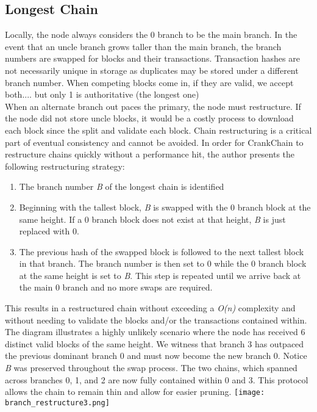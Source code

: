 \documentclass[10pt,twocolumn]{article}
\begin{document}
\subsection{Longest Chain}
Locally, the node always considers the 0 branch to be the main branch.  In the event that an uncle branch grows taller than the main branch, the branch numbers are swapped for blocks and their transactions.  Transaction hashes are not necessarily unique in storage as duplicates may be stored under a different branch number. When competing blocks come in, if they are valid, we accept both.... but only 1 is authoritative (the longest one)\\
When an alternate branch out paces the primary, the node must restructure.  If the node did not store uncle blocks, it would be a costly process to download each block since the split and validate each block.  Chain restructuring is a critical part of eventual consistency and cannot be avoided.  In order for CrankChain to restructure chains quickly without a performance hit, the author presents the following restructuring strategy:
\begin{enumerate}[noitemsep]
\item The branch number \textit{B} of the longest chain is identified
\item Beginning with the tallest block, \textit{B} is swapped with the 0 branch block at the same height.  If a 0 branch block does not exist at that height, \textit{B} is just replaced with 0.
\item The previous hash of the swapped block is followed to the next tallest block in that branch.  The branch number is then set to 0 while the 0 branch block at the same height is set to \textit{B}.  This step is repeated until we arrive back at the main 0 branch and no more swaps are required.
\end{enumerate}
This results in a restructured chain without exceeding a \textit{O(n)} complexity and without needing to validate the blocks and/or the transactions contained within.  The diagram illustrates a highly unlikely scenario where the node has received 6 distinct valid blocks of the same height.  We witness that branch 3 has outpaced the previous dominant branch 0 and must now become the new branch 0.  Notice \textit{B} was preserved throughout the swap process.  The two chains, which spanned across branches 0, 1, and 2 are now fully contained within 0 and 3.  This protocol allows the chain to remain thin and allow for easier pruning.
\texttt{[image: branch\_restructure3.png]}
\end{document}
